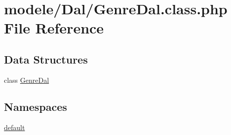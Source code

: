 \hypertarget{_genre_dal_8class_8php}{}\section{modele/\+Dal/\+Genre\+Dal.class.\+php File Reference}
\label{_genre_dal_8class_8php}
\subsection*{Data Structures}
\begin{DoxyCompactItemize}
\item 
class \hyperlink{class_genre_dal}{Genre\+Dal}
\end{DoxyCompactItemize}
\subsection*{Namespaces}
\begin{DoxyCompactItemize}
\item 
 \hyperlink{namespacedefault}{default}
\end{DoxyCompactItemize}
